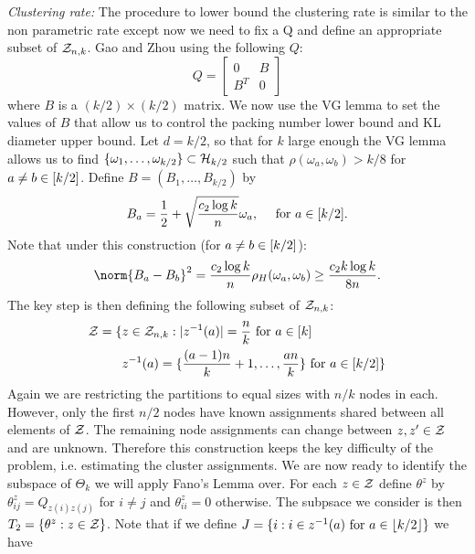 \documentclass[11pt]{article}
\begin{document}
\textit{Clustering rate:} The procedure to lower bound the clustering rate is similar to the non parametric rate except now we need to fix a Q and define an appropriate subset of $\mathcal{Z}_{n,k}$. Gao and Zhou using the following $Q$:
\begin{equation}\label{eq:clusterQ}
Q = \left[
\begin{array}{cc}
0 & B \\
B^T & 0
\end{array}
\right]
\end{equation}
where $B$ is a $(k/2) \times (k/2)$ matrix. We now use the VG lemma to set the values of $B$ that allow us to control the packing number lower bound and KL diameter upper bound. Let $d = k/2$, so that for $k$ large enough the VG lemma allows us to find $\{\omega_1, \dots, \omega_{k/2}\} \subset \mathcal{H}_{k/2}$ such that $\rho(\omega_a, \omega_b) > k/8$ for $a \neq b \in \lbrack k/2\rbrack$. Define $B = (B_1, \dots, B_{k/2})$ by
\begin{equation}
B_a = \frac{1}{2} + \sqrt{\frac{c_2 \log k}{n}}\omega_a, \quad \text{ for } a \in \lbrack k/2\rbrack.
\end{equation}
Note that under this construction (for $a \neq b \in \lbrack k/2\rbrack$):
\begin{equation}
\norm{B_a - B_b}^2 = \frac{c_2 \log k}{n} \rho_H(\omega_a, \omega_b) \geq \frac{c_2 k \log k}{8 n}.
\end{equation}
The key step is then defining the following subset of $\mathcal{Z}_{n,k}$:
\begin{equation}
\begin{aligned}
\mathcal{Z} = \{&z \in \mathcal{Z}_{n,k} : |z^{-1}(a)| = \frac{n}{k} \text{ for } a \in \lbrack k\rbrack \\
          &z^{-1}(a) = \{\frac{(a-1)n}{k} + 1, \dots, \frac{an}{k}\} \text{ for } a \in \lbrack k/2\rbrack\}
\end{aligned}
\end{equation}
Again we are restricting the partitions to equal sizes with $n/k$ nodes in each. However, only the first $n/2$ nodes have known assignments shared between all elements of $\mathcal{Z}$. The remaining node assignments can change between $z, z' \in \mathcal{Z}$ and are unknown. Therefore this construction keeps the key difficulty of the problem, i.e. estimating the cluster assignments. We are now ready to identify the subspace of $\Theta_k$ we will apply Fano's Lemma over. For each $z \in \mathcal{Z}$ define $\theta^{z}$ by $\theta_{ij}^z = Q_{z(i)z(j)}$ for $i \neq j$ and $\theta_{ii}^z = 0$ otherwise. The subpsace we consider is then $T_2 = \{\theta^{z} : z \in \mathcal{Z}\}$. Note that if we define $J = \{i : i \in z^{-1}(a) \text{ for } a \in \lfloor k/2\rfloor\}$ we have
\end{document}
